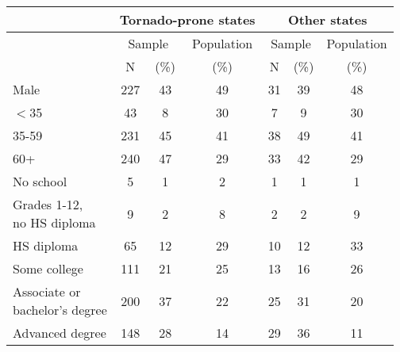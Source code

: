 
\begin{table}[ht]
\centering
\begin{tabular}{|l|ccc|ccc|}
\hline 
 & \multicolumn{3}{c|}{\textbf{Tornado-prone states}} & \multicolumn{3}{c|}{\textbf{Other states}}\\

\hline 
 & \multicolumn{2}{c}{Sample} & Population & \multicolumn{2}{c}{Sample} & Population\\

  \hline
 & N & (\%) & (\%) & N & (\%) & (\%) \\ 
  \hline

Male & 227 & 43 & 49 & 31 & 39 & 48 \\ 
  $<$35 & 43 & 8 & 30 & 7 & 9 & 30 \\ 
  35-59 & 231 & 45 & 41 & 38 & 49 & 41 \\ 
  60+ & 240 & 47 & 29 & 33 & 42 & 29 \\ 
  No school & 5 & 1 & 2 & 1 & 1 & 1 \\ 
   \makecell[l]{Grades 1-12,\\ no HS diploma}& 9 & 2 & 8 & 2 & 2 & 9 \\ 
  HS diploma & 65 & 12 & 29 & 10 & 12 & 33 \\ 
  Some college & 111 & 21 & 25 & 13 & 16 & 26 \\ 
  \makecell[l]{Associate or\\ bachelor's degree} & 200 & 37 & 22 & 25 & 31 & 20 \\ 
  Advanced degree & 148 & 28 & 14 & 29 & 36 & 11 \\ 
\hline
\end{tabular}
\end{table}